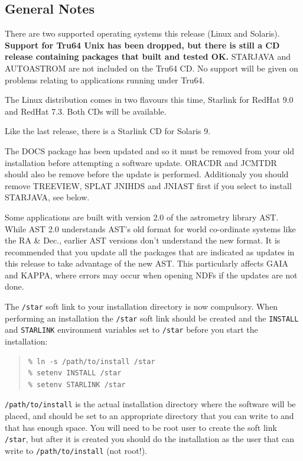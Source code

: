 \documentclass[twoside,11pt]{article}
\newcommand{\xlabel}[1]{}
\renewcommand{\_}{\texttt{\symbol{95}}}
\begin{document}
\subsection{\xlabel{General Notes}General Notes}

There are two supported operating systems this release (Linux and Solaris).
\textbf{Support for Tru64 Unix has been dropped, but there is still a CD release
containing packages that built and tested OK.} STARJAVA and AUTOASTROM are
not included on the Tru64 CD. No support will be given on problems relating
to applications running under Tru64.
 
The Linux distribution comes in two flavours this time, Starlink for
RedHat 9.0 and RedHat 7.3. Both CDs will be available.

Like the last release, there is a Starlink CD for Solaris 9.

The DOCS package has been updated and so it must be removed from
your old installation before attempting a software update. ORACDR and
JCMTDR should also be remove before the update is performed. Additionaly
you should remove TREEVIEW, SPLAT JNIHDS and JNIAST first if you select to
install STARJAVA, see below. 

Some applications are built with version 2.0 of the astrometry
library AST. While AST 2.0 understands AST's old format for world
co-ordinate systems like the RA \& Dec., earlier AST versions don't 
understand the new format. It is recommended that you update all the 
packages that are indicated as updates in this release to take advantage
of the new AST. This particularly affects GAIA and KAPPA, where errors 
may occur when opening NDFs if the updates are not done.

The \texttt{/star} soft link to your installation directory is now 
compulsory. When performing an installation the \texttt{/star} 
soft link should be created and the \texttt{INSTALL} and 
\texttt{STARLINK} environment variables set to \texttt{/star} before you 
start the installation:

\begin{quote}
\begin{verbatim}
% ln -s /path/to/install /star
% setenv INSTALL /star
% setenv STARLINK /star 
\end{verbatim}
\end{quote}

\texttt{/path/to/install} is the actual installation directory where
the software will be placed, and should be set to an appropriate 
directory that you can write to and that has enough space. You will 
need to be root user to create the soft link \texttt{/star}, but after it is 
created you should do the installation as the user that can write 
to \texttt{/path/to/install} (not root!).
\end{document}
